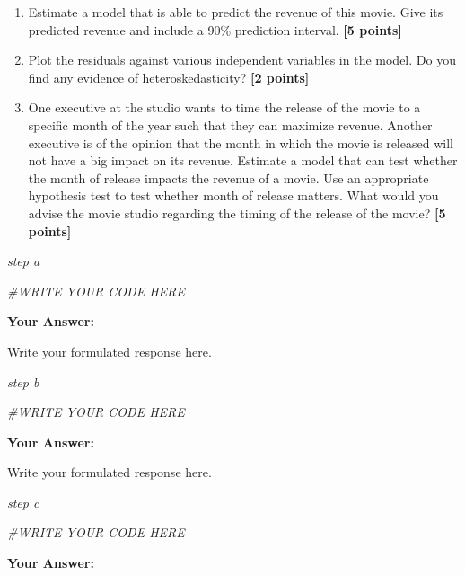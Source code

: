 \documentclass[
]{article}
\newenvironment{Shaded}{\begin{snugshade}}{\end{snugshade}}
\newcommand{\CommentTok}[1]{\textcolor[rgb]{0.56,0.35,0.01}{\textit{#1}}}
\providecommand{\tightlist}{%
  \setlength{\itemsep}{0pt}\setlength{\parskip}{0pt}}
\begin{document}
\begin{enumerate}
\def\labelenumi{\alph{enumi}.}
\setcounter{enumi}{3}
\tightlist
\item
  Estimate a model that is able to predict the revenue of this movie.
  Give its predicted revenue and include a 90\% prediction interval.
  \textbf{[5 points]}
\item
  Plot the residuals against various independent variables in the model.
  Do you find any evidence of heteroskedasticity? \textbf{[2 points]}
\item
  One executive at the studio wants to time the release of the movie to
  a specific month of the year such that they can maximize revenue.
  Another executive is of the opinion that the month in which the movie
  is released will not have a big impact on its revenue. Estimate a
  model that can test whether the month of release impacts the revenue
  of a movie. Use an appropriate hypothesis test to test whether month
  of release matters. What would you advise the movie studio regarding
  the timing of the release of the movie? \textbf{[5 points]}
\end{enumerate}

\emph{step a}

\begin{Shaded}
\begin{Highlighting}[]
\CommentTok{\#WRITE YOUR CODE HERE}
\end{Highlighting}
\end{Shaded}

\textbf{Your Answer:}

Write your formulated response here.

\emph{step b}

\begin{Shaded}
\begin{Highlighting}[]
\CommentTok{\#WRITE YOUR CODE HERE}
\end{Highlighting}
\end{Shaded}

\textbf{Your Answer:}

Write your formulated response here.

\emph{step c}

\begin{Shaded}
\begin{Highlighting}[]
\CommentTok{\#WRITE YOUR CODE HERE}
\end{Highlighting}
\end{Shaded}

\textbf{Your Answer:}
\end{document}
